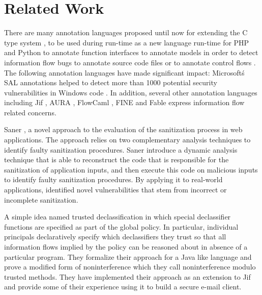\chapter{Related Work}

There are many annotation languages proposed until now for
extending the C type system \cite{ref_54_condit:dependent}, \cite{ref_53_evans:static,ref_51_microsoft:sal,ref_55_sun:lock,ref_56_torvalds:sparse} to be
used during run-time as a new language run-time for PHP and
Python \cite{ref_57_alex:improving} to annotate function interfaces \cite{ref_53_evans:static,ref_51_microsoft:sal,ref_56_torvalds:sparse} to
annotate models in order to detect information flow bugs \cite{ref_58_iflow:kuzman}
to annotate source code files \cite{ref_59_rosenblum:towards,ref_60_rosenblum:practical,ref_61_lintan:acomment} or to annotate
control flows \cite{ref_53_evans:static,ref_52_splint:flow,ref_51_microsoft:sal}. The following annotation languages have made significant impact: Microsoft\'s SAL annotations \cite{ref_51_microsoft:sal} helped to detect more than 1000 potential security vulnerabilities in Windows
code \cite{ref_50_ball:research}. In addition, several other annotation languages including  Jif \cite{ref_48_chong:jif}, AURA \cite{ref_46_jia:aura}, FlowCaml \cite{ref_32_simonet:report}, FINE \cite{ref_45_nikhil:fine} and Fable \cite{ref_47_swamy:fable} express information flow related concerns.

Saner \cite{ref_61_lintan:acomment}, a novel approach to the evaluation of the sanitization process in web applications. The approach relies on two complementary analysis techniques to identify faulty sanitization procedures. Saner \cite{ref_61_lintan:acomment} introduce a dynamic analysis technique that is
able to reconstruct the code that is responsible for
the sanitization of application inputs, and then execute this code on malicious inputs to identify faulty
sanitization procedures. By applying
it to real-world applications, identified novel vulnerabilities that stem from incorrect or incomplete sanitization.

A simple idea named trusted declassification \cite{ref_2_hicks2006trusted} in which special declassifier functions are specified as part of the global policy. In particular, individual principals declaratively specify which declassifiers they trust so that all information flows implied by the policy can be reasoned about in absence of a particular program. They formalize their approach for a Java like language and prove a modified form of noninterference which they call noninterference modulo trusted methods. They have implemented their approach as an extension to Jif and provide some of their experience using it to build a secure e-mail client.

